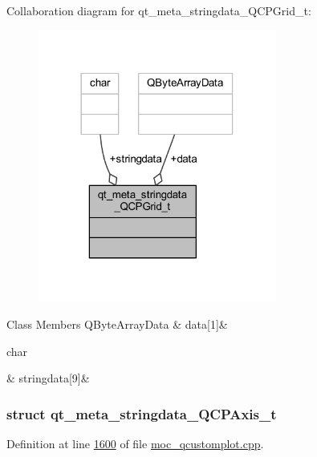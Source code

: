 Collaboration diagram for qt\+\_\+meta\+\_\+stringdata\+\_\+\+Q\+C\+P\+Grid\+\_\+t\+:
\nopagebreak
\begin{figure}[H]
\begin{center}
\leavevmode
\includegraphics[width=222pt]{de/df3/a00185}
\end{center}
\end{figure}
\begin{DoxyFields}{Class Members}
\hypertarget{a00016_a7e6e5bd7ca3eb3f18073d11e635e5cb9}{Q\+Byte\+Array\+Data}\label{a00016_a7e6e5bd7ca3eb3f18073d11e635e5cb9}
&
data\mbox{[}1\mbox{]}&
\\
\hline

\hypertarget{a00016_a0bcd248c91a252f9ad93a353181ea07e}{char}\label{a00016_a0bcd248c91a252f9ad93a353181ea07e}
&
stringdata\mbox{[}9\mbox{]}&
\\
\hline

\end{DoxyFields}
\label{d0/d61/a00100}
\hypertarget{a00016_d0/d61/a00100}{}
\subsubsection{struct qt\+\_\+meta\+\_\+stringdata\+\_\+\+Q\+C\+P\+Axis\+\_\+t}


Definition at line \hyperlink{a00016_source_l01600}{1600} of file \hyperlink{a00016_source}{moc\+\_\+qcustomplot.\+cpp}.



